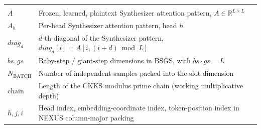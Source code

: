 \begin{longtable}{@{}p{3.5cm}p{11cm}@{}}
\vspace{0.5cm} & \vspace{0.5cm} \\

$A$                  & Frozen, learned, plaintext Synthesizer attention pattern, $A \in \mathbb{R}^{L\times L}$ \\
$A_h$                & Per-head Synthesizer attention pattern, head $h$ \\
$\mathit{diag}_d$    & $d$-th diagonal of the Synthesizer pattern, $\mathit{diag}_d[i] = A[i, (i+d)\bmod L]$ \\
$bs, gs$             & Baby-step / giant-step dimensions in BSGS, with $bs \cdot gs = L$ \\
$N_{\mathrm{BATCH}}$ & Number of independent samples packed into the slot dimension \\
$\mathrm{chain}$     & Length of the CKKS modulus prime chain (working multiplicative depth) \\
$h, j, i$            & Head index, embedding-coordinate index, token-position index in NEXUS column-major packing \\
\end{longtable}
